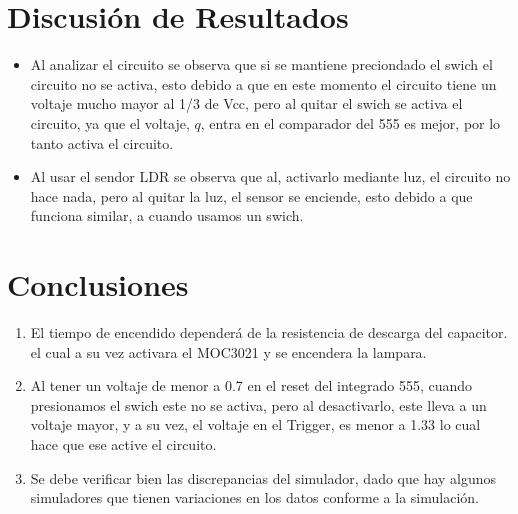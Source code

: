 \documentclass[osajnl,twocolumn,showpacs,superscriptaddress,10pt]{revtex4-1}
\begin{document}
\section{Discusión de Resultados}

    
\begin{itemize}
	\item Al analizar el circuito se observa que si se mantiene preciondado el swich el circuito no se activa, esto debido a que en este momento el circuito tiene un voltaje mucho mayor al 1/3 de Vcc, pero al quitar el swich se activa el circuito, ya que el voltaje, $q$, entra en el comparador del 555 es mejor, por lo tanto activa el circuito.
 
	\item Al usar el sendor LDR se observa que al, activarlo mediante luz, el circuito no hace nada, pero al quitar la luz, el sensor se enciende, esto debido a que funciona similar, a cuando usamos un swich.
\end{itemize}


\section{Conclusiones}


\begin{enumerate}
    \item El tiempo de encendido dependerá de la resistencia de descarga del capacitor. el cual a su vez activara el MOC3021 y se encendera la lampara.\\
    
    \item Al tener un voltaje de menor a 0.7 en el reset del integrado 555, cuando presionamos el swich este no se activa, pero al desactivarlo, este lleva a un voltaje mayor, y a su vez, el voltaje en el Trigger, es menor a 1.33 lo cual hace que ese active el circuito.\\
    
    \item Se debe verificar bien las discrepancias del simulador, dado que hay algunos simuladores que tienen variaciones en los datos conforme a la simulación.
\end{enumerate}
\end{document}

